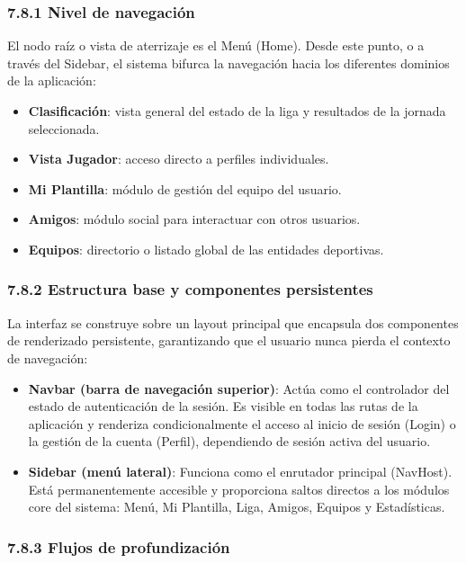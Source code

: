 \subsubsection{7.8.1 Nivel de navegación}

El nodo raíz o vista de aterrizaje es el Menú (Home). Desde este punto, o a
través del Sidebar, el sistema bifurca la navegación hacia los diferentes
dominios de la aplicación:

\begin{itemize}
\item \textbf{Clasificación}: vista general del estado de la liga y resultados de
la jornada seleccionada.
\item \textbf{Vista Jugador}: acceso directo a perfiles individuales.
\item \textbf{Mi Plantilla}: módulo de gestión del equipo del usuario.
\item \textbf{Amigos}: módulo social para interactuar con otros usuarios.
\item \textbf{Equipos}: directorio o listado global de las entidades deportivas.
\end{itemize}


\subsubsection{7.8.2 Estructura base y componentes persistentes}

La interfaz se construye sobre un layout principal que encapsula dos componentes
de renderizado persistente, garantizando que el usuario nunca pierda el contexto
de navegación:

\begin{itemize}
\item \textbf{Navbar (barra de navegación superior)}: Actúa como el controlador
del estado de autenticación de la sesión. Es visible en todas las rutas de la
aplicación y renderiza condicionalmente el acceso al inicio de sesión (Login) o
la gestión de la cuenta (Perfil), dependiendo de sesión activa
del usuario.
\item \textbf{Sidebar (menú lateral)}: Funciona como el enrutador principal
(NavHost). Está permanentemente accesible y proporciona saltos directos a los
módulos core del sistema: Menú, Mi Plantilla, Liga, Amigos, Equipos y Estadísticas.
\end{itemize}

\subsubsection{7.8.3 Flujos de profundización}

